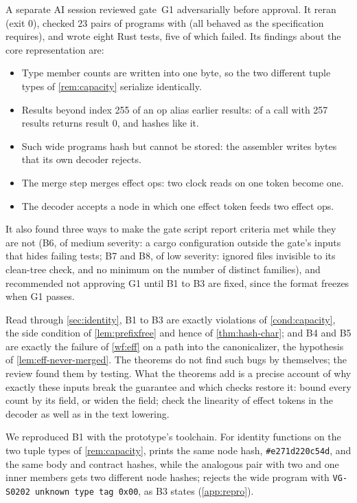 A separate AI session reviewed gate~G1 adversarially before approval. It reran
 (exit $0$), checked 23 pairs of programs with  (all behaved as the
specification requires), and wrote eight Rust tests, five of which failed. Its findings about
the core representation are:
\begin{itemize}
\item[B1] Type member counts are written into one byte, so the two different tuple types of
  \cref{rem:capacity} serialize identically.
\item[B2] Results beyond index 255 of an op alias earlier results:  of a call
  with 257 results returns result $0$, and hashes like it.
\item[B3] Such wide programs hash but cannot be stored: the assembler writes bytes that its own
  decoder rejects.
\item[B4] The merge step merges effect ops: two clock reads on one token become one.
\item[B5] The decoder accepts a node in which one effect token feeds two effect ops.
\end{itemize}
It also found three ways to make the gate script report criteria met while they are not (B6, of
medium severity: a cargo
configuration outside the gate's inputs that hides failing tests; B7 and B8, of low severity:
ignored files invisible to its clean-tree check, and no minimum on the number of distinct
families), and recommended not approving
G1 until B1 to B3 are fixed, since the format freezes when G1 passes.

Read through \cref{sec:identity}, B1 to B3 are exactly violations of \cref{cond:capacity}, the
side condition of \cref{lem:prefixfree} and hence of \cref{thm:hash-char}; and B4 and B5 are
exactly the failure of \ref{wf:eff} on a path into the canonicalizer, the hypothesis of
\cref{lem:eff-never-merged}. The theorems do not find such bugs by themselves; the review found
them by testing. What the theorems add is a precise account of why exactly these inputs break the
guarantee and which checks restore it: bound every count by its field, or widen the field; check
the linearity of effect tokens in the decoder as well as in the text lowering.

We reproduced B1 with the prototype's toolchain. For identity functions on the two tuple types
of \cref{rem:capacity},  prints the same node hash, \texttt{\#e271d220c54d}, and the
same body and contract hashes, while the analogous pair with two and one inner members gets two
different node hashes;  rejects the wide program with
\texttt{VG-S0202 unknown type tag 0x00}, as B3 states (\cref{app:repro}).

